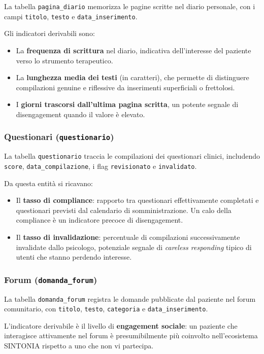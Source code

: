 La tabella \texttt{pagina\_diario} memorizza le pagine scritte nel diario personale, con i campi \texttt{titolo}, \texttt{testo} e \texttt{data\_inserimento}.

Gli indicatori derivabili sono:
\begin{itemize}
    \item La \textbf{frequenza di scrittura} nel diario, indicativa dell'interesse del paziente verso lo strumento terapeutico.
    \item La \textbf{lunghezza media dei testi} (in caratteri), che permette di distinguere compilazioni genuine e riflessive da inserimenti superficiali o frettolosi.
    \item I \textbf{giorni trascorsi dall'ultima pagina scritta}, un potente segnale di disengagement quando il valore è elevato.
\end{itemize}

\subsubsection{Questionari (\texttt{questionario})}

La tabella \texttt{questionario} traccia le compilazioni dei questionari clinici, includendo \texttt{score}, \texttt{data\_compilazione}, i flag \texttt{revisionato} e \texttt{invalidato}.

Da questa entità si ricavano:
\begin{itemize}
    \item Il \textbf{tasso di compliance}: rapporto tra questionari effettivamente completati e questionari previsti dal calendario di somministrazione. Un calo della compliance è un indicatore precoce di disengagement.
    \item Il \textbf{tasso di invalidazione}: percentuale di compilazioni successivamente invalidate dallo psicologo, potenziale segnale di \textit{careless responding} tipico di utenti che stanno perdendo interesse.
\end{itemize}

\subsubsection{Forum (\texttt{domanda\_forum})}

La tabella \texttt{domanda\_forum} registra le domande pubblicate dal paziente nel forum comunitario, con \texttt{titolo}, \texttt{testo}, \texttt{categoria} e \texttt{data\_inserimento}.

L'indicatore derivabile è il livello di \textbf{engagement sociale}: un paziente che interagisce attivamente nel forum è presumibilmente più coinvolto nell'ecosistema SINTONIA rispetto a uno che non vi partecipa.

